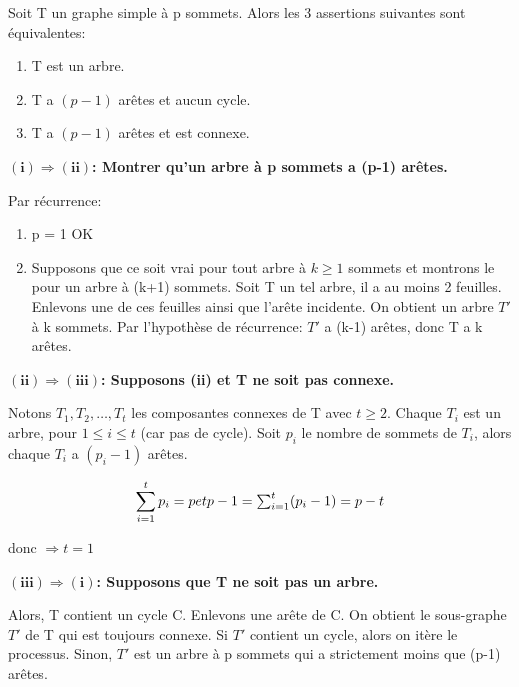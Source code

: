 \begin{thrm}[\textcolor{red}{ATTENTION! Ce théorème et sa démonstration font partie de ceux à connaitre par coeur à l'examen! (pour l'année 2015-2016)}]
Soit T un graphe simple à p sommets. Alors les 3 assertions suivantes sont équivalentes:
	\begin{enumerate}[i]
		\item T est un arbre.
		\item T a $(p-1)$ arêtes et aucun cycle.
		\item T a $(p-1)$ arêtes et est connexe.
	\end{enumerate}
\end{thrm}

\begin{demo}

$\mathbf{(i) \Rightarrow (ii)}$\textbf{: Montrer qu'un arbre à p sommets a (p-1) arêtes.}

	Par récurrence:
		\begin{enumerate}
			\item p = 1 OK 
			\item Supposons que ce soit vrai pour tout arbre à $ k \geq 1$ sommets et montrons le pour un arbre à (k+1) sommets. Soit T un tel arbre, il a au moins 2 feuilles. Enlevons une de ces feuilles ainsi que l'arête incidente. On obtient un arbre ${T}'$ à k sommets. Par l’hypothèse de récurrence: ${T}'$ a (k-1) arêtes, donc T a k arêtes.
		\end{enumerate} 

\hspace{-0.5cm}$\mathbf{(ii) \Rightarrow (iii)}$\textbf{: Supposons (ii) et T ne soit pas connexe.}

	Notons $T_{1}, T_{2},\ldots,T_{t}$ les composantes connexes de T avec $t \geq 2$. Chaque $T_{i}$ est un arbre, pour $1 \leq i \leq t$ (car pas de cycle). Soit $p_{i}$ le nombre de sommets de $T_{i}$, alors chaque $T_{i}$ a $(p_{i}-1)$ arêtes.

	\begin{minipage}{.5\textwidth}
		\[\sum_{i=1}^{t} p_{i} = p$$ et $$p-1 = \sum_{i=1}^{t} (p_{i}-1) = p - t \]
	\end{minipage}
	\begin{minipage}{.5\textwidth}
		donc $\Rightarrow t = 1 $
	\end{minipage}

\hspace{-0.5cm}$\mathbf{(iii) \Rightarrow (i)}$\textbf{: Supposons que T ne soit pas un arbre.}

	Alors, T contient un cycle C. Enlevons une arête de C. On obtient le sous-graphe ${T}'$ de T qui est toujours connexe. Si ${T}'$ contient un cycle, alors on itère le processus. Sinon, ${T}'$ est un arbre à p sommets qui a strictement moins que (p-1) arêtes.
		
\end{demo}

